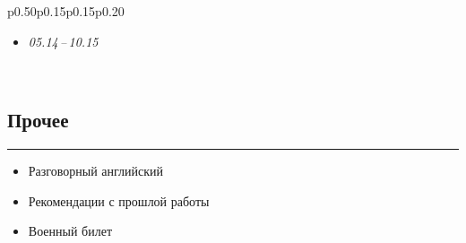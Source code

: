 \documentclass[11pt, a4paper]{article}
\newcommand{\Delimitline}{
  \vspace{-2ex}
  {\rule{\linewidth}{0.13ex}}
}
\newcommand\Eng[1]{%
  \foreignlanguage{english}{#1}%
}
\let\it\textit
\begin{document}
\begin{frame}
\begin{spacing}{0.3}
\begin{tabular}{p{0.50\textwidth}p{0.15\textwidth}p{0.15\textwidth}p{0.20\textwidth}}
  \begin{itemize}
  \item[] 
    \it{05.14\,--\,10.15}
  \end{itemize} \\

\end{tabular}
\end{spacing}

\end{frame}


\subsection*{{Прочее}}
\Delimitline
\begin{itemize}
  \item Разговорный английский
  \item Рекомендации с прошлой работы
  \item Военный билет
\end{itemize}
\end{document}
